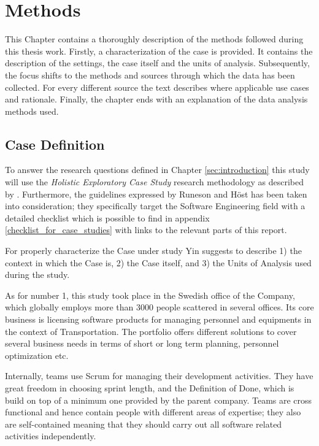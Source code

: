 \chapter{Methods} \label{methods}
This Chapter contains a thoroughly description of the methods followed during this thesis work. Firstly, a characterization of the case is provided. It contains the description of the settings, the case itself and the units of analysis. Subsequently, the focus shifts to the methods and sources through which the data has been collected. For every different source the text describes where applicable use cases and rationale. Finally, the chapter ends with an explanation of the data analysis methods used. 


%
%
%
%
\section{Case Definition}	\label{sec:case-description}
To answer the research questions defined in Chapter \ref{sec:introduction} this study will use the \textit{Holistic Exploratory Case Study} research methodology as described by \cite{case_study_guide}. Furthermore, the guidelines expressed by Runeson and H{\"o}st \cite{case_study_software_engineering} has been taken into consideration; they specifically target the Software Engineering field with a detailed checklist which is possible to find in appendix \ref{checklist_for_case_studies} with links to the relevant parts of this report.


For properly characterize the Case under study Yin \cite{case_study_guide} suggests to describe 1) the context in which the Case is, 2) the Case itself, and 3) the Units of Analysis used during the study.

As for number 1, this study took place in the Swedish office of the Company, which globally employs more than 3000 people scattered in several offices. Its core business is licensing software products for managing personnel and equipments in the context of Transportation. The portfolio offers different solutions to cover several business needs in terms of short or long term planning, personnel optimization etc.

Internally, teams use Scrum for managing their development activities. They have great freedom in choosing sprint length, and the Definition of Done, which is build on top of a minimum one provided by the parent company. Teams are cross functional and hence contain people with different areas of expertise; they also are self-contained meaning that they should carry out all software related activities independently.


